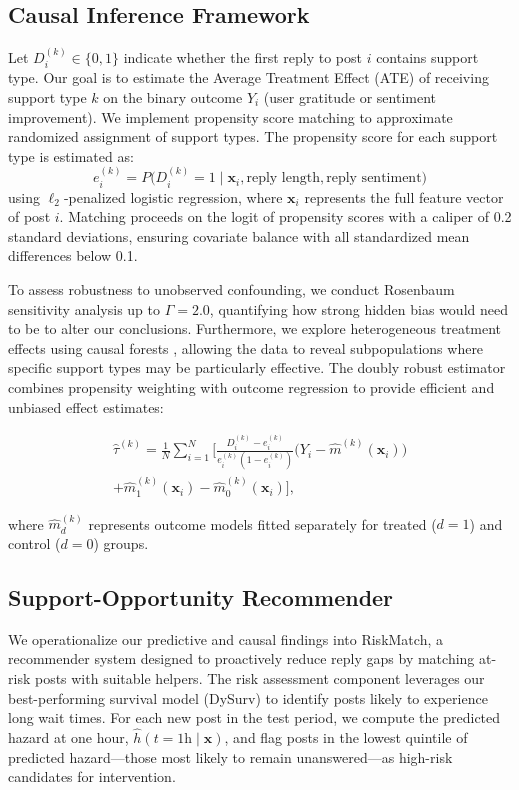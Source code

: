 \documentclass[letterpaper]{article} %
\begin{document}
\subsection{Causal Inference Framework}
Let $D_i^{(k)} \in \{0,1\}$ indicate whether the first reply to post $i$ contains support type. Our goal is to estimate the Average Treatment Effect (ATE) of receiving support type $k$ on the binary outcome $Y_i$ (user gratitude or sentiment improvement). We implement propensity score matching to approximate randomized assignment of support types. The propensity score for each support type is estimated as:
\begin{equation}
e_i^{(k)} = P\bigl(D_i^{(k)}=1 \mid \mathbf{x}_i, \text{reply length}, \text{reply sentiment}\bigr)
\end{equation}
using $\ell_2$-penalized logistic regression, where $\mathbf{x}_i$ represents the full feature vector of post $i$. Matching proceeds on the logit of propensity scores with a caliper of 0.2 standard deviations, ensuring covariate balance with all standardized mean differences below 0.1.

To assess robustness to unobserved confounding, we conduct Rosenbaum sensitivity analysis up to $\Gamma = 2.0$, quantifying how strong hidden bias would need to be to alter our conclusions. Furthermore, we explore heterogeneous treatment effects using causal forests \citep{athey2019estimating}, allowing the data to reveal subpopulations where specific support types may be particularly effective. The doubly robust estimator combines propensity weighting with outcome regression to provide efficient and unbiased effect estimates:

\begin{multline}
\label{eq:doubly_robust}
\widehat{\tau}^{(k)} = \frac{1}{N}\sum_{i=1}^N \Biggl[ \frac{D_i^{(k)} - e_i^{(k)}}{e_i^{(k)}(1-e_i^{(k)})} \bigl(Y_i - \hat{m}^{(k)}(\mathbf{x}_i)\bigr) \\
+ \hat{m}_1^{(k)}(\mathbf{x}_i) - \hat{m}_0^{(k)}(\mathbf{x}_i) \Biggr],
\end{multline}

where $\hat{m}_d^{(k)}$ represents outcome models fitted separately for treated ($d=1$) and control ($d=0$) groups.

\subsection{Support-Opportunity Recommender}

We operationalize our predictive and causal findings into RiskMatch, a recommender system designed to proactively reduce reply gaps by matching at-risk posts with suitable helpers. The risk assessment component leverages our best-performing survival model (DySurv) to identify posts likely to experience long wait times. For each new post in the test period, we compute the predicted hazard at one hour, $\hat{h}(t=1\text{h}\mid\mathbf{x})$, and flag posts in the lowest quintile of predicted hazard—those most likely to remain unanswered—as high-risk candidates for intervention.
\end{document}
